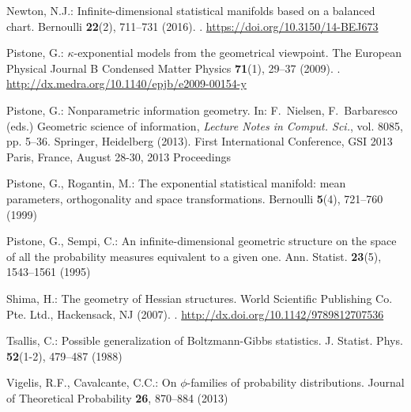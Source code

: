 \documentclass[graybox]{svmult}
\begin{document}
\begin{thebibliography}{10}
Newton, N.J.: Infinite-dimensional statistical manifolds based on a balanced
  chart.
\newblock Bernoulli \textbf{22}(2), 711--731 (2016).
\newblock {}.
\newblock \urlprefix\url{https://doi.org/10.3150/14-BEJ673}

Pistone, G.: $\kappa$-exponential models from the geometrical viewpoint.
\newblock The European Physical Journal B Condensed Matter Physics
  \textbf{71}(1), 29--37 (2009).
\newblock {}.
\newblock \urlprefix\url{http://dx.medra.org/10.1140/epjb/e2009-00154-y}

Pistone, G.: Nonparametric information geometry.
\newblock In: F.~Nielsen, F.~Barbaresco (eds.) Geometric science of
  information, \emph{Lecture Notes in Comput. Sci.}, vol. 8085, pp. 5--36.
  Springer, Heidelberg (2013).
\newblock First International Conference, GSI 2013 Paris, France, August 28-30,
  2013 Proceedings

Pistone, G., Rogantin, M.: The exponential statistical manifold: mean
  parameters, orthogonality and space transformations.
\newblock Bernoulli \textbf{5}(4), 721--760 (1999)

Pistone, G., Sempi, C.: An infinite-dimensional geometric structure on the
  space of all the probability measures equivalent to a given one.
\newblock Ann. Statist. \textbf{23}(5), 1543--1561 (1995)

Shima, H.: The geometry of {H}essian structures.
\newblock World Scientific Publishing Co. Pte. Ltd., Hackensack, NJ (2007).
\newblock {}.
\newblock \urlprefix\url{http://dx.doi.org/10.1142/9789812707536}

Tsallis, C.: Possible generalization of {B}oltzmann-{G}ibbs statistics.
\newblock J. Statist. Phys. \textbf{52}(1-2), 479--487 (1988)

Vigelis, R.F., Cavalcante, C.C.: On $\phi$-families of probability
  distributions.
\newblock Journal of Theoretical Probability \textbf{26}, 870--884 (2013)

\end{thebibliography}
\end{document}
